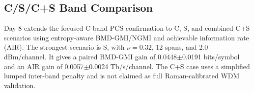 \subsection{C/S/C+S Band Comparison}
Day-8 extends the focused C-band PCS confirmation to C, S, and combined C+S scenarios using entropy-aware BMD-GMI/NGMI and achievable information rate (AIR). The strongest scenario is S, with $\nu=0.32$, 12 spans, and 2.0 dBm/channel. It gives a paired BMD-GMI gain of 0.0448$\pm$0.0191 bits/symbol and an AIR gain of 0.0057$\pm$0.0024 Tb/s/channel. The C+S case uses a simplified lumped inter-band penalty and is not claimed as full Raman-calibrated WDM validation.
